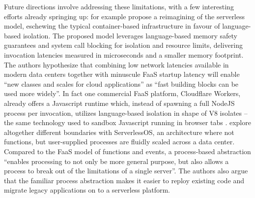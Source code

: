 Future directions involve addressing these limitations, with a few interesting efforts already springing up: \textcite{boucher18puttingmicroback} for example propose a reimagining of the serverless model, eschewing the typical container-based infrastructure in favour of language-based isolation. The proposed model leverages language-based memory safety guarantees and system call blocking for isolation and resource limits, delivering invocation latencies measured in microseconds and a smaller memory footprint. The authors hypothesize that combining low network latencies available in modern data centers together with minuscule FaaS startup latency will enable ``new classes and scales for cloud applications'' as ``fast building blocks can be used more widely''. In fact one commercial FaaS platform, Cloudflare Workers, already offers a Javascript runtime which, instead of spawning a full NodeJS process per invocation, utilizes language-based isolation in shape of V8 isolates -- the same technology used to sandbox Javascript running in browser tabs \parencite{cloudflareWorkers18}. \textcite{alali18moreServerless} explore altogether different boundaries with ServerlessOS, an architecture where not functions, but user-supplied processes are fluidly scaled across a data center. Compared to the FaaS model of functions and events, a process-based abstraction ``enables processing to not only be more general purpose, but also allows a process to break out of the limitations of a single server''. The authors also argue that the familiar process abstraction makes it easier to reploy existing code and migrate legacy applications on to a serverless platform.

